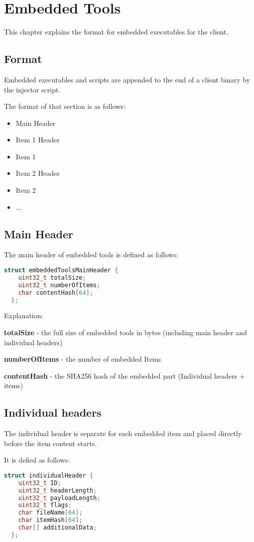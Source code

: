 \chapter{Embedded Tools}
\label{chapt-embeddedTools}
This chapter explains the format for embedded executables for the client.

\section{Format}
Embedded executables and scripts are appended to the end of a client binary by the injector script.

The format of that section is as follows:
\begin{itemize}
  \item Main Header
  \item Item 1 Header
  \item Item 1
  \item Item 2 Header
  \item Item 2
  \item ...
\end{itemize}
\section{Main Header}
The main header of embedded tools is defined as follows:
\begin{lstlisting}[language=C++]
  struct embeddedToolsMainHeader {
    uint32_t totalSize;
    uint32_t numberOfItems;
    char contentHash[64];
  };
\end{lstlisting}

Explanation:

\textbf{totalSize} - the full size of embedded tools in bytes (including main header and individual headers)

\textbf{numberOfItems} - the number of embedded Items

\textbf{contentHash} - the SHA256 hash of the embedded part (Individual headers + items)

\section{Individual headers}

The individual header is separate for each embedded item and placed directly before the item content starts.

It is defied as follows:
\begin{lstlisting}[language=C++]
  struct individualHeader {
    uint32_t ID;
    uint32_t headerLength;
    uint32_t payloadLength;
    uint32_t flags;
    char fileName[64];
    char itemHash[64];
    char[] additionalData;
  };
\end{lstlisting}

